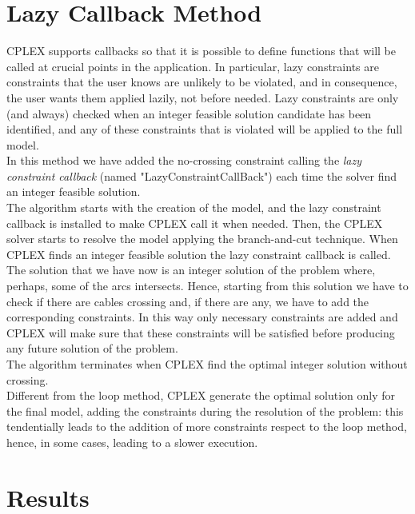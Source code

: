 \section{Lazy Callback Method}
\textsc{CPLEX} supports callbacks so that it is possible to define functions that will be called at crucial points in the application. In particular, lazy constraints are constraints that the user knows are unlikely to be violated, and in consequence, the user
wants them applied lazily, not before needed. Lazy constraints are only (and always) checked when an integer feasible solution candidate has been identified, and any of these constraints that is violated will be applied to the full model. \\
In this method we have added the no-crossing constraint calling the \textit{lazy constraint callback} (named "LazyConstraintCallBack") each time the solver find an integer feasible solution. \\
The algorithm starts with the creation of the model, and the lazy constraint callback is installed to make \textsc{CPLEX} call it when needed. Then, the \textsc{CPLEX} solver starts to resolve the model applying the branch-and-cut technique. When \textsc{CPLEX} finds an integer feasible solution the lazy constraint callback is called. The solution that we have now is an integer solution of the problem where, perhaps, some of
the arcs intersects. Hence, starting from this solution we have to check if there are cables crossing and, if there are any, we have to add the corresponding constraints. In this way only necessary constraints are added and \textsc{CPLEX} will make sure that these constraints will be satisfied before producing any future solution of the problem.\\
The algorithm terminates when \textsc{CPLEX} find the optimal integer solution without crossing. \\
Different from the loop method, \textsc{CPLEX} generate the optimal solution only for the final model, adding the constraints during the resolution of the problem: this tendentially leads to the addition of more constraints respect to the loop method, hence, in some cases, leading to a slower execution.

\section{Results}

